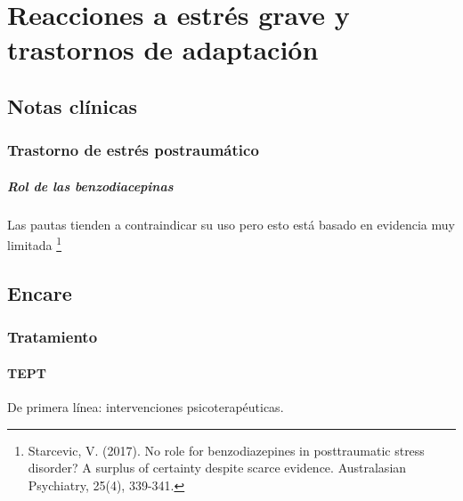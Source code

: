 \chapter{Reacciones a estrés grave y trastornos de adaptación}
\section*{Notas clínicas}
\subsection*{Trastorno de estrés postraumático}
\paragraph{Rol de las benzodiacepinas}
Las pautas tienden a contraindicar su uso pero esto está basado en evidencia muy limitada \footnote{Starcevic, V. (2017). No role for benzodiazepines in posttraumatic stress disorder? A surplus of certainty despite scarce evidence. Australasian Psychiatry, 25(4), 339-341.}
\section*{Encare}
\subsection*{Tratamiento}
\subsubsection*{TEPT}
De primera línea: intervenciones psicoterapéuticas.
